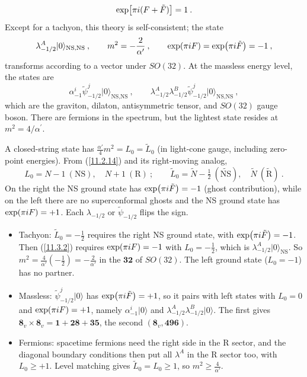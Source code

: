 \begin{equation}
	\exp[\pi i(F+\tilde{F})] =1 \:. \label{11.3.2}
\end{equation}
Except for a tachyon, this theory is self-consistent; the state
\begin{equation}
	\lambda_{-1/2}^{A}\lvert 0\rangle_{\text{NS,NS}}\:, \qquad m^{2}=-\frac{2}{\alpha^{\prime}}\:,\qquad
	\exp(\pi i F)=\exp(\pi i\tilde{F})=-1\:,  \label{11.3.3}
\end{equation}
transforms according to a vector under $SO(32)$. At the massless energy level, the states are
\begin{equation}
	\alpha^{i}_{-1}\tilde{\psi}^{j}_{-1/2} \lvert0\rangle_{\text{NS,NS}} \:, \qquad
	\lambda^{A}_{-1/2}\lambda_{-1/2}^{B}\tilde{\psi}^{j}_{-1/2}\lvert 0\rangle_{\text{NS,NS}} \:, \label{11.3.4}
\end{equation}
which are the graviton, dilaton, antisymmetric tensor, and $SO(32)$ gauge boson. There are fermions in the spectrum, but the lightest state resides at $m^{2}=4/\alpha^{\prime}$.
\begin{tcolorbox}[breakable]
	\begin{remark}
		A closed-string state has $\frac{\alpha'}{4}m^{2}=L_{0}=\tilde{L}_{0}$ (in light-cone gauge, including zero-point energies). From (\ref{11.2.14}) and its right-moving analog,
		\begin{equation*}
			L_{0}=N-1\ (\text{NS}),\quad N+1\ (\text{R})\:;\qquad \tilde{L}_{0}=\tilde{N}-\tfrac{1}{2}\ (\widetilde{\text{NS}}),\quad \tilde{N}\ (\widetilde{\text{R}})\:.
		\end{equation*}
		On the right the NS ground state has $\exp(\pi i\tilde{F})=-1$ (ghost contribution), while on the left there are no superconformal ghosts and the NS ground state has $\exp(\pi i F)=+1$. Each $\lambda_{-1/2}$ or $\tilde{\psi}_{-1/2}$ flips the sign.
		\begin{itemize}
			\item Tachyon: $\tilde{L}_{0}=-\frac{1}{2}$ requires the right NS ground state, with $\exp(\pi i\tilde{F})=-1$. Then (\ref{11.3.2}) requires $\exp(\pi i F)=-1$ with $L_{0}=-\frac{1}{2}$, which is $\lambda^{A}_{-1/2}\lvert0\rangle_{\text{NS}}$. So $m^{2}=\frac{4}{\alpha'}(-\frac{1}{2})=-\frac{2}{\alpha'}$ in the $\mathbf{32}$ of $SO(32)$. The left ground state ($L_{0}=-1$) has no partner.
			\item Massless: $\tilde{\psi}^{j}_{-1/2}\lvert0\rangle$ has $\exp(\pi i\tilde{F})=+1$, so it pairs with left states with $L_{0}=0$ and $\exp(\pi i F)=+1$, namely $\alpha^{i}_{-1}\lvert0\rangle$ and $\lambda^{A}_{-1/2}\lambda^{B}_{-1/2}\lvert0\rangle$. The first gives $\mathbf{8}_{v}\times\mathbf{8}_{v}=\mathbf{1}+\mathbf{28}+\mathbf{35}$, the second $(\mathbf{8}_{v},\mathbf{496})$.
			\item Fermions: spacetime fermions need the right side in the R sector, and the diagonal boundary conditions then put all $\lambda^{A}$ in the R sector too, with $L_{0}\geq+1$. Level matching gives $\tilde{L}_{0}=L_{0}\geq1$, so $m^{2}\geq\frac{4}{\alpha'}$.
		\end{itemize}
	\end{remark}
\end{tcolorbox}

